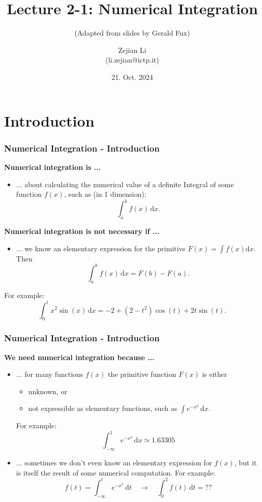 \documentclass[11pt,aspectratio=169,handout]{beamer}
\begin{document}
\author{Zejian Li \\(li.zejian@ictp.it)}
\title{Lecture 2-1: Numerical Integration}
\subtitle{(Adapted from slides by Gerald Fux)}
\date{21. Oct. 2024}


\begin{frame}[plain]
	\maketitle
\end{frame}


\section{Introduction}

\begin{frame}
\frametitle{Numerical Integration - Introduction}
\textbf{Numerical integration is ...}
\begin{itemize}
 \item ... about calculating the numerical value of a definite Integral of some function $f(x)$, such as (in 1 dimension): 
$$ \int_a^b f(x) \, \mathrm{d}x. $$
\end{itemize}

\pause
\textbf{Numerical integration is not necessary if ...}
\begin{itemize}
	\item ... we know an elementary expression for the primitive $F(x) = \int f(x) \mathrm{d}x$.
	Then
	$$ \int_a^b f(x) \, \mathrm{d}x = F(b) - F(a). $$
	\pause
\end{itemize}
For example:
$$ \int_0^t x^2 \sin(x) \, \mathrm{d}x = -2 + (2 - t^2) \cos(t) + 2 t \sin(t).$$
\end{frame}


\begin{frame}
\frametitle{Numerical Integration - Introduction}
\textbf{We need numerical integration because ...}
\begin{itemize}
	\item ... for many functions $f(x)$ the primitive function $F(x)$ is either
	\begin{itemize}
		\item unknown, or
		\item not expressible as elementary functions, such as $\int e^{-x^2}\, \mathrm{d}x$.
	\end{itemize}
	\pause
	For example:
	$$ \int_{-\infty}^{1} e^{-x^2}\,\mathrm{d}x \simeq 1.63305$$
	\pause
	\item ... sometimes we don't even know an elementary expression for $f(x)$, but it is itself the result of some numerical computation.
	\pause
	For example:
	$$ f(t) = \int_{-\infty}^{t} e^{-x^2} \,\mathrm{d}t \quad \rightarrow \quad \int_0^2 f(t) \,\mathrm{d}t = ?? $$
\end{itemize}
\end{frame}
\end{document}
